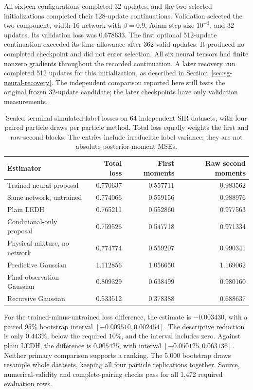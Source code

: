 All sixteen configurations completed 32 updates, and the two selected
initializations completed their 128-update continuations. Validation selected
the two-component, width-16 network with \(\beta=0.9\), Adam step size
\(10^{-3}\), and 32 updates. Its validation loss was \(0.678633\).
The first optional 512-update continuation exceeded its time allowance after
362 valid updates. It produced no completed checkpoint and did not enter
selection. All six neural tensors had finite nonzero gradients throughout
the recorded continuation. A later recovery run completed 512 updates for this
initialization, as described in Section~\ref{sec:sg-neural-recovery}. The
independent comparison reported here still tests the original frozen
32-update candidate; the later checkpoints have only validation measurements.

\begin{table}[ht]
\centering
\begin{tabular}{lrrr}
\toprule
Estimator & Total loss & First moments & Raw second moments\\
\midrule
Trained neural proposal & 0.770637 & 0.557711 & 0.983562\\
Same network, untrained & 0.774066 & 0.559156 & 0.988976\\
Plain LEDH & 0.765211 & 0.552860 & 0.977563\\
Conditional-only proposal & 0.759526 & 0.547718 & 0.971334\\
Physical mixture, no network & 0.774774 & 0.559207 & 0.990341\\
Predictive Gaussian & 1.112856 & 1.056650 & 1.169062\\
Final-observation Gaussian & 0.809329 & 0.638499 & 0.980160\\
Recursive Gaussian & 0.533512 & 0.378388 & 0.688637\\
\bottomrule
\end{tabular}
\caption{Scaled terminal simulated-label losses on 64 independent SIR
datasets, with four paired particle draws per particle method. Total loss
equally weights the first and raw-second blocks. The entries include
irreducible label variance; they are not absolute posterior-moment MSEs.}
\label{tab:sg-neural-risk}
\end{table}

For the trained-minus-untrained loss difference, the estimate is
\(-0.003430\), with a paired 95\% bootstrap interval
\([-0.009510,0.002454]\). The descriptive reduction is only \(0.443\%\),
below the required \(10\%\), and the interval includes zero. Against plain
LEDH, the difference is \(0.005425\), with interval
\([-0.050125,0.063136]\). Neither primary comparison supports a ranking.
The 5,000 bootstrap draws resample whole datasets, keeping all four particle
replications together. Source, numerical-validity and complete-pairing checks
pass for all 1,472 required evaluation rows.


